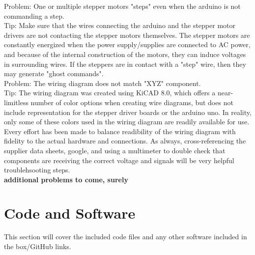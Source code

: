 \documentclass[12pt,oneside,letterpaper]{article}
\begin{document}
Problem: One or multiple stepper motors "steps" even when the arduino is not commanding a step. \\
Tip: Make sure that the wires connecting the arduino and the stepper motor drivers are not contacting the stepper motors themselves. The stepper motors are constantly energized when the power supply/supplies are connected to AC power, and because of the internal construction of the motors, they can induce voltages in surrounding wires. If the steppers are in contact with a "step" wire, then they may generate "ghost commands".\\

Problem: The wiring diagram does not match "XYZ" component. \\
Tip: The wiring diagram was created using KiCAD 8.0, which offers a near-limitless number of color options when creating wire diagrams, but does not include representation for the stepper driver boards or the arduino uno. In reality, only some of these colors used in the wiring diagram are readily available for use. Every effort has been made to balance readibility of the wiring diagram with fidelity to the actual hardware and connections.  As always, cross-referencing the supplier data sheets, google, and using a multimeter to double check that components are receiving the correct voltage and signals will be very helpful troublehsooting steps.\\

\textbf{additional problems to come, surely}

\section{Code and Software}
This section will cover the included code files and any other software included in the box/GitHub links.
\end{document}
